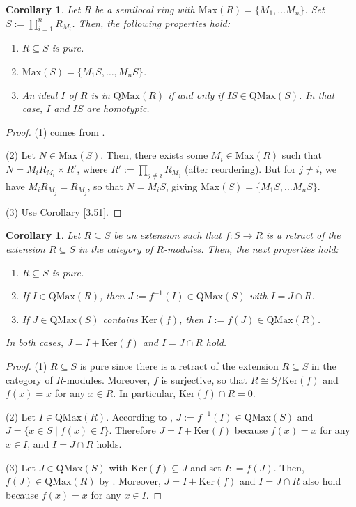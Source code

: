 \documentclass[12pt,leqno]{amsart}
\newtheorem{corollary}[theorem]{Corollary}
\theoremstyle{definition}
\begin{document}
\begin{corollary}\label{3.6} Let $R$ be a semilocal ring with $\mathrm {Max}(R)=\{M_1,\ldots M_n\}$. Set $S:=\prod_{i=1}^nR_{M_i}$. Then, the following properties hold:
\begin{enumerate}
\item $R\subseteq S$ is pure.
\item $\mathrm{Max}(S)=\{M_1S,\ldots, M_nS\}$.
\item An ideal $I$ of $R$ is in $\mathrm{QMax}(R)$ if and only if $IS\in\mathrm{QMax}(S)$. In that case, $I$ and $IS$ are homotypic. 
\end{enumerate} 
\end{corollary}
\begin{proof} (1) comes from \cite[Exemple 1.3.2]{OP}.

(2) Let $N\in \mathrm{Max}(S)$. Then, there exists some $M_i\in \mathrm{Max}(R)$ such that $N=M_iR_{M_i}\times R'$, where $R':=\prod_{j\neq i}R_{M_j}$ (after reordering). But for $j\neq i$, we have $M_iR_{M_j} =R_{M_j}$, so that $N=M_iS$, giving $\mathrm{Max}(S)=\{M_1S,\ldots M_nS\}$.

(3) Use Corollary \ref{3.51}. 
\end{proof}

\begin{corollary}\label{3.7} Let $R\subseteq S$ be an extension such that $f:S\to R$ is a retract of the extension $R\subseteq S$ in the category of $R$-modules.  Then, the next properties hold:
\begin{enumerate}
\item $R\subseteq S$ is pure.
\item If $I\in\mathrm{QMax}(R)$, then $J:=f^{-1}(I)\in\mathrm{QMax}(S)$  with $I=J\cap R$.
\item If $J\in\mathrm{QMax}(S)$ contains $\mathrm{Ker}(f)$, then $I:=f(J)\in\mathrm{QMax}(R)$. 
\end{enumerate} 

In both cases, $J=I+\mathrm{Ker}(f)$ and $I=J\cap R$ hold.
\end{corollary}
\begin{proof} (1) $R\subseteq S$ is pure since there is a retract of the extension $R\subseteq S$ in the category of $R$-modules. Moreover, $f$ is surjective, so that $R\cong S/\mathrm{Ker}(f)$ and $f(x)=x$ for any $x\in R$. In particular, $\mathrm{Ker}(f)\cap R=0$.

(2) Let $I\in\mathrm{QMax}(R)$. According to \cite[Proposition 2 (ii)]{AKKT}, $J:=f^{-1}(I)\in\mathrm{QMax}(S)$ and $J=\{x\in S\mid f(x)\in I\}$. Therefore $J=I+\mathrm{Ker}(f)$ because $f(x)=x$ for any $x\in I$, and $I=J\cap R$ holds. 

(3) Let $J\in\mathrm{QMax}(S)$ with $\mathrm{Ker}(f)\subseteq J$ and set $I: =f(J)$. Then, $f(J)\in\mathrm{QMax}(R)$ by \cite[Proposition 2 (i)]{AKKT}. Moreover, $J=I+\mathrm{Ker}(f)$ and $I=J\cap R$ also hold because $f(x)=x$ for any $x\in I$. 
\end{proof}
\end{document}
